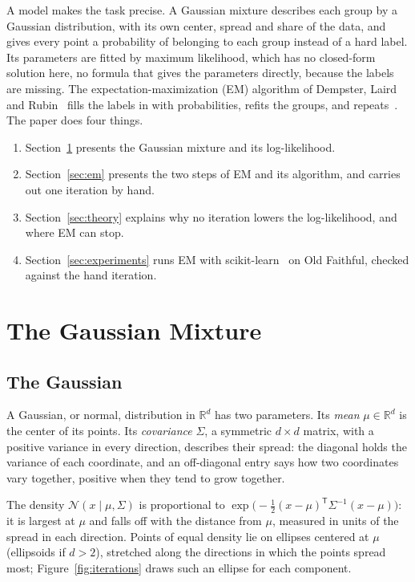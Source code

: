 \documentclass[11pt,a4paper]{amsart}
\numberwithin{equation}{section}
\theoremstyle{plain}
\theoremstyle{definition}
\theoremstyle{remark}
\newcommand{\R}{\mathbb{R}}
\newcommand{\N}{\mathcal{N}}
\newcommand{\T}{\mathsf{T}}
\newcommand{\given}{\mid}
\begin{document}
A model makes the task precise. A Gaussian mixture describes each group
by a Gaussian distribution, with its own center, spread and share of the
data, and gives every point a probability of belonging to each group
instead of a hard label. Its parameters are fitted by maximum
likelihood, which has no closed-form solution here, no formula that
gives the parameters directly, because the labels are missing. The
expectation-maximization (EM) algorithm of Dempster,
Laird and Rubin~\cite{dempster1977} fills the labels in with
probabilities, refits the groups, and repeats~\cite{bishop2006,
mclachlan2008}. The paper does four things.
\begin{enumerate}[leftmargin=*, nosep]
\item Section~\ref{sec:model} presents the Gaussian mixture and its
  log-likelihood.
\item Section~\ref{sec:em} presents the two steps of EM and its
  algorithm, and carries out one iteration by hand.
\item Section~\ref{sec:theory} explains why no iteration lowers the
  log-likelihood, and where EM can stop.
\item Section~\ref{sec:experiments} runs EM with
  scikit-learn~\cite{pedregosa2011} on Old Faithful, checked against the
  hand iteration.
\end{enumerate}

\section{The Gaussian Mixture}\label{sec:model}

\subsection{The Gaussian}\label{sec:gaussian}

A Gaussian, or normal, distribution in $\R^d$ has two parameters. Its
\emph{mean} $\mu \in \R^d$ is the center of its points. Its
\emph{covariance} $\Sigma$, a symmetric $d \times d$ matrix, with a
positive variance in every direction, describes their spread: the
diagonal holds the variance of each coordinate, and an off-diagonal
entry says how two coordinates vary together, positive when they tend to
grow together.

The density $\N(x \given \mu, \Sigma)$ is proportional to
$\exp\bigl(-\tfrac12 (x - \mu)^\T \Sigma^{-1} (x - \mu)\bigr)$: it is
largest at $\mu$ and falls off with the distance from $\mu$, measured in
units of the spread in each direction. Points of equal density lie on
ellipses centered at $\mu$ (ellipsoids if $d > 2$), stretched along the
directions in which the points spread most;
Figure~\ref{fig:iterations} draws such an ellipse for each component.
\end{document}
